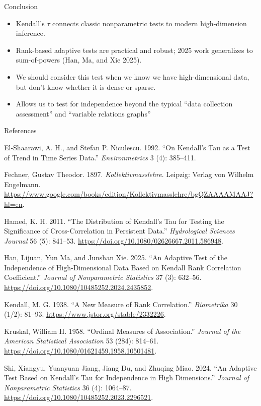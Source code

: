 \documentclass[
  ignorenonframetext,
]{beamer}
\newlength{\cslhangindent}
\newenvironment{CSLReferences}[2] %
 {\begin{list}{}{%
  \setlength{\itemindent}{0pt}
  \setlength{\leftmargin}{0pt}
  \setlength{\parsep}{0pt}
  \ifodd #1
   \setlength{\leftmargin}{\cslhangindent}
   \setlength{\itemindent}{-1\cslhangindent}
  \fi
  \setlength{\itemsep}{#2\baselineskip}}}
 {\end{list}}
\providecommand{\tightlist}{%
  \setlength{\itemsep}{0pt}\setlength{\parskip}{0pt}}
\begin{document}
\begin{frame}{Conclusion}
\label{conclusion}
\begin{itemize}
\tightlist
\item
  Kendall's \(\tau\) connects classic nonparametric tests to modern
  high-dimension inference.
\item
  Rank-based adaptive tests are practical and robust; 2025 work
  generalizes to sum-of-powers (Han, Ma, and Xie 2025).
\item
  We should consider this test when we know we have high-dimensional
  data, but don't know whether it is dense or sparse.
\item
  Allows us to test for independence beyond the typical ``data
  collection assessment'' and ``variable relations graphs''
\end{itemize}
\end{frame}

\begin{frame}[allowframebreaks]{References}
\label{references}
\scriptsize

\label{refs}
\begin{CSLReferences}{1}{0}
El-Shaarawi, A. H., and Stefan P. Niculescu. 1992. {``On Kendall's Tau
as a Test of Trend in Time Series Data.''} \emph{Environmetrics} 3 (4):
385--411.

Fechner, Gustav Theodor. 1897. \emph{Kollektivmasslehre}. Leipzig:
Verlag von Wilhelm Engelmann.
\url{https://www.google.com/books/edition/Kollektivmasslehre/bgQZAAAAMAAJ?hl=en}.

Hamed, K. H. 2011. {``The Distribution of Kendall's Tau for Testing the
Significance of Cross-Correlation in Persistent Data.''}
\emph{Hydrological Sciences Journal} 56 (5): 841--53.
\url{https://doi.org/10.1080/02626667.2011.586948}.

Han, Lijuan, Yun Ma, and Junshan Xie. 2025. {``An Adaptive Test of the
Independence of High-Dimensional Data Based on Kendall Rank Correlation
Coefficient.''} \emph{Journal of Nonparametric Statistics} 37 (3):
632--56. \url{https://doi.org/10.1080/10485252.2024.2435852}.

Kendall, M. G. 1938. {``A New Measure of Rank Correlation.''}
\emph{Biometrika} 30 (1/2): 81--93.
\url{https://www.jstor.org/stable/2332226}.

Kruskal, William H. 1958. {``Ordinal Measures of Association.''}
\emph{Journal of the American Statistical Association} 53 (284):
814--61. \url{https://doi.org/10.1080/01621459.1958.10501481}.

Shi, Xiangyu, Yuanyuan Jiang, Jiang Du, and Zhuqing Miao. 2024. {``An
Adaptive Test Based on Kendall's Tau for Independence in High
Dimensions.''} \emph{Journal of Nonparametric Statistics} 36 (4):
1064--87. \url{https://doi.org/10.1080/10485252.2023.2296521}.

\end{CSLReferences}
\end{frame}
\end{document}
